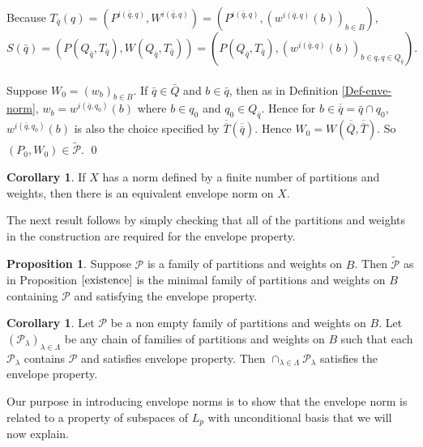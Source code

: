 \documentclass[12pt]{amsart}
\theoremstyle{definition}
\newtheorem{corollary}[theorem]{Corollary}
\newtheorem{proposition}[theorem]{Proposition}
\theoremstyle{remark}
\numberwithin{equation}{section}
\begin{document}
Because $T_{\bar{q}}(q)=\left( P^{i(\bar{q},q)},
  W^{i(\bar{q},q)}\right)=\left( P^{i(\bar{q},q)},
  (w^{i(\bar{q},q)}(b))_{b\in B}\right)$, \\
$$S(\bar{q})=\left( P(Q_{\bar{q}}, T_{\bar{q}}),W(Q_{\bar{q}}, T_{\bar{q}})
  \right)=\left( P(Q_{\bar{q}},
    T_{\bar{q}}),(w^{i(\bar{q},q)}(b))_{b\in q,q\in
      Q_{\bar{q}}}\right).$$\\
Suppose $W_0=(w_b)_{b\in B}$. If $\bar{q}\in \bar{Q}$ and $b\in
\bar{q}$, then as in Definition \ref{Def-enve-norm},
$w_b=w^{i(\bar{q},q_0)}(b)$
where $b\in q_0$ and $q_0 \in Q_{\bar{q}}$.
Hence for $b\in \overline{\overline{q}}=\bar{q}\cap q_0$, 
$w^{i(\bar{q},q_0)}(b)$ is also the choice specified by 
$\overline{\overline{T}}(\overline{\overline{q}})$. 
Hence $W_0=W(\overline{\overline{Q}}, \overline{\overline{T}})$.
So $(P_0, W_0)\in \tilde{\mathcal{P}}$. \qed

\begin{corollary} If $X$ has a norm defined by a finite number of
  partitions and weights, then there is an equivalent envelope norm on
$X$.
\end{corollary}

The next result follows by simply checking that all of the partitions
and weights in the construction are required for the envelope property.\\

\begin{proposition}
\label{minimal}
Suppose $\mathcal{P}$ is a family of partitions and weights on $B$.
 Then $\tilde{\mathcal{P}}$ as in Proposition $\ref{existence}$ 
is the minimal family of partitions and weights on $B$ containing
 $\mathcal{P}$ and satisfying the envelope property.
\end{proposition}

\begin{corollary}
Let $\mathcal{P}$ be a non empty family of partitions and weights on
 $B$.
 Let $(\mathcal{P_{\lambda}})_{\lambda \in \Lambda}$ be any chain of
 families of partitions and weights on $B$ such that each
 $\mathcal{P_{\lambda}}$ contains $\mathcal{P}$ and satisfies envelope
 property. Then $\cap_{\lambda \in \Lambda} \mathcal{P}_{\lambda}$
 satisfies the envelope property.
\end{corollary}

Our purpose in introducing envelope norms is to show that the 
envelope norm is related to a property of subspaces of $L_p$ 
with unconditional basis that we will now explain.
\end{document}
